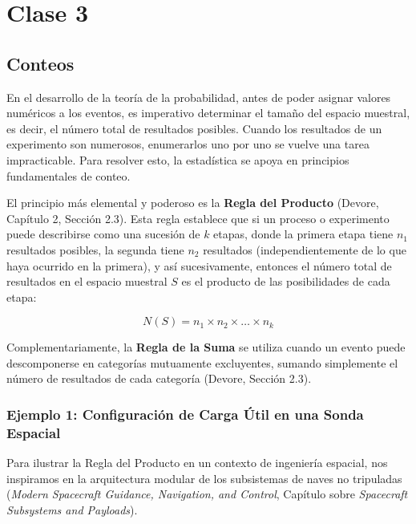 \chapter{Clase 3}

\section{Conteos}

En el desarrollo de la teoría de la probabilidad, antes de poder asignar valores numéricos a los eventos, es imperativo determinar el tamaño del espacio muestral, es decir, el número total de resultados posibles. Cuando los resultados de un experimento son numerosos, enumerarlos uno por uno se vuelve una tarea impracticable. Para resolver esto, la estadística se apoya en principios fundamentales de conteo. 

El principio más elemental y poderoso es la \textbf{Regla del Producto} (Devore, Capítulo 2, Sección 2.3). Esta regla establece que si un proceso o experimento puede describirse como una sucesión de $k$ etapas, donde la primera etapa tiene $n_1$ resultados posibles, la segunda tiene $n_2$ resultados (independientemente de lo que haya ocurrido en la primera), y así sucesivamente, entonces el número total de resultados en el espacio muestral $S$ es el producto de las posibilidades de cada etapa:

$$ N(S) = n_1 \times n_2 \times \dots \times n_k $$

Complementariamente, la \textbf{Regla de la Suma} se utiliza cuando un evento puede descomponerse en categorías mutuamente excluyentes, sumando simplemente el número de resultados de cada categoría (Devore, Sección 2.3).

\subsection{Ejemplo 1: Configuración de Carga Útil en una Sonda Espacial}

Para ilustrar la Regla del Producto en un contexto de ingeniería espacial, nos inspiramos en la arquitectura modular de los subsistemas de naves no tripuladas (\textit{Modern Spacecraft Guidance, Navigation, and Control}, Capítulo sobre \textit{Spacecraft Subsystems and Payloads}). 


